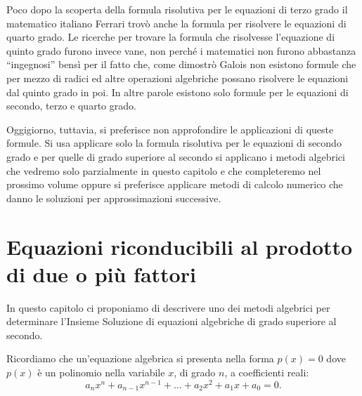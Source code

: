 \begin{exrig}
\begin{esempio}
Poco dopo la scoperta della formula risolutiva per le equazioni di terzo grado 
il matematico italiano Ferrari trovò anche la formula per risolvere le 
equazioni di quarto grado. 
Le ricerche per trovare la formula che risolvesse l'equazione di quinto grado 
furono invece vane, non perché i matematici non furono abbastanza 
``ingegnosi'' bensì per il fatto che, come dimostrò Galois non esistono 
formule che per mezzo di radici ed altre operazioni algebriche possano 
risolvere le equazioni dal quinto grado in poi. In altre parole esistono 
solo formule per le equazioni di secondo, terzo e quarto grado.

Oggigiorno, tuttavia, si preferisce non approfondire le applicazioni di queste 
formule. Si usa applicare solo la formula risolutiva per le equazioni di secondo 
grado e per quelle di grado superiore al secondo si applicano i metodi 
algebrici che vedremo solo parzialmente in questo capitolo e che completeremo 
nel prossimo volume  oppure si preferisce applicare metodi di calcolo 
numerico che danno le soluzioni per approssimazioni successive.
\end{esempio}
\end{exrig}

\section{Equazioni riconducibili al prodotto di due o più fattori}
\label{sec:eq2gr_scomponibili}

In questo capitolo ci proponiamo di descrivere uno dei metodi algebrici per 
determinare l'Insieme Soluzione di equazioni algebriche di grado superiore 
al secondo.

Ricordiamo che un'equazione algebrica si presenta nella forma $p(x)=0$ dove 
$p(x)$ è un polinomio nella variabile $x$, di grado $n$, a coefficienti reali: 
\[a_nx^n+a_{n-1}x^{n-1}+ \ldots +a_2x^2+a_1x+a_0=0.\]

